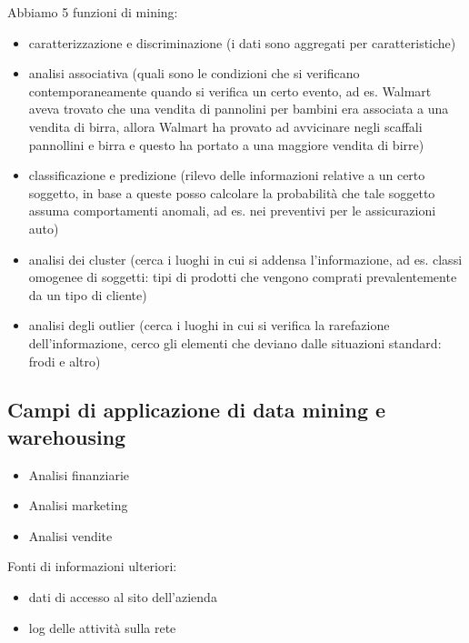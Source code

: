 Abbiamo 5 funzioni di mining:

\begin{itemize}

\item
  caratterizzazione e discriminazione (i dati sono aggregati per
  caratteristiche)
\item
  analisi associativa (quali sono le condizioni che si verificano
  contemporaneamente quando si verifica un certo evento, ad es. Walmart
  aveva trovato che una vendita di pannolini per bambini era associata a
  una vendita di birra, allora Walmart ha provato ad avvicinare negli
  scaffali pannollini e birra e questo ha portato a una maggiore vendita
  di birre)
\item
  classificazione e predizione (rilevo delle informazioni relative a un
  certo soggetto, in base a queste posso calcolare la probabilit\`a che
  tale soggetto assuma comportamenti anomali, ad es. nei preventivi per
  le assicurazioni auto)
\item
  analisi dei cluster (cerca i luoghi in cui si addensa l'informazione, ad es. classi omogenee di soggetti: tipi di prodotti che vengono comprati
  prevalentemente da un tipo di cliente)
\item
  analisi degli outlier (cerca i luoghi in cui si verifica la
  rarefazione dell'informazione, cerco gli elementi che deviano dalle situazioni standard: frodi e altro)
\end{itemize}

\subsection{Campi di applicazione di data mining e
warehousing}\label{campi-di-applicazione-di-data-mining-e-warehousing}

\begin{itemize}

\item
  Analisi finanziarie
\item
  Analisi marketing
\item
  Analisi vendite
\end{itemize}

Fonti di informazioni ulteriori:

\begin{itemize}

\item
  dati di accesso al sito dell'azienda
\item
  log delle attivit\`a sulla rete
\end{itemize}

